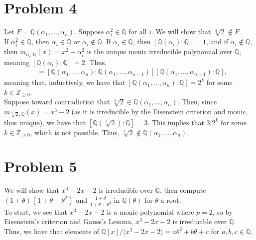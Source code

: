 \documentclass[10pt]{extarticle}
\newcommand{\Q}{\mathbb{Q}}
\newcommand{\Z}{\mathbb{Z}}
\begin{document}
  \section{Problem 4}%
  Let $F = \Q(\alpha_1,\dots,\alpha_n)$. Suppose $\alpha_i^2\in \Q$ for all $i$. We will show that $\sqrt[3]{2}\notin F$.\\

  If $\alpha_i^2\in \Q$, then $\alpha_i \in \Q$ or $\alpha_i \notin \Q$. If $\alpha_i \in \Q$, then $[\Q(\alpha_i):\Q] = 1$, and if $\alpha_i \notin \Q$, then $m_{\alpha_i,\Q}(x) = x^2 - \alpha_i^2$ is the unique monic irreducible polynomial over $\Q$, meaning $[\Q(\alpha_i):\Q] = 2$. Thus,
  \begin{align*}
    [\Q(\alpha_1,\dots,\alpha_n):\Q] &= [\Q(\alpha_1,\dots,\alpha_n):\Q(\alpha_1,\dots,\alpha_{n-1})][\Q(\alpha_1,\dots,\alpha_{n-1}):\Q],
  \end{align*}
  meaning that, inductively, we have that $[\Q(\alpha_1,\dots,\alpha_n):\Q] = 2^{k}$ for some $k\in \Z_{\geq 0}$.\\

  Suppose toward contradiction that $\sqrt[3]{2}\in \Q(\alpha_1,\dots,\alpha_n)$. Then, since $m_{\sqrt[3]{2},\Q}(x) = x^3 - 2$ (as it is irreducible by the Eisenstein criterion and monic, thus unique), we have that $[\Q(\sqrt[3]{2}):\Q] = 3$. This implies that $3|2^{k}$ for some $k\in \Z_{\geq 0}$, which is not possible. Thus, $\sqrt[3]{2}\notin \Q(\alpha_1,\dots,\alpha_n)$.
  \section{Problem 5}%
  We will show that $x^3 - 2x - 2$ is irreducible over $\Q$, then compute $(1+\theta)(1+\theta + \theta^2)$ and $\frac{1+\theta}{1+\theta+\theta^2}$ in $\Q(\theta)$ for $\theta$ a root.\\

  To start, we see that $x^3 - 2x - 2$ is a monic polynomial where $p = 2$, so by Eisenstein's criterion and Gauss's Lemma, $x^3 - 2x - 2$ is irreducible over $\Q$. Thus, we have that elements of $\Q[x]/\langle x^3 - 2x - 2\rangle = a\theta^2 + b\theta + c$ for $a,b,c\in \Q$.\\
\end{document}
